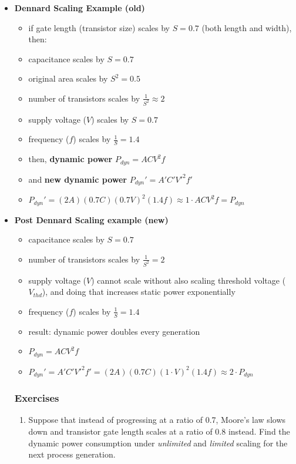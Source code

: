 \documentclass[12pt]{extarticle}
\begin{document}
\begin{itemize}
        \item \textbf{Dennard Scaling Example (old)}
        \begin{itemize}
            \item if gate length (transistor size) scales by $S = 0.7$ (both length and width), then:
            \item capacitance scales by $S = 0.7$
            \item original area scales by $S^2 = 0.5$
            \item number of transistors scales by $\frac{1}{S^2} \approx 2$
            \item supply voltage ($V$) scales by $S = 0.7$
            \item frequency ($f$) scales by $\frac{1}{S} = 1.4$
            \item then, \textbf{dynamic power} $P_{dyn} = ACV^2f$
            \item and \textbf{new dynamic power} $P_{dyn}' = A'C'V'^2f'$
            \item $P_{dyn}' = (2A)(0.7C)(0.7V)^2(1.4f) \approx 1 \cdot ACV^2f = P_{dyn}$
        \end{itemize}

        \item \textbf{Post Dennard Scaling example (new)}
        \begin{itemize}
            \item capacitance scales by $S = 0.7$
            \item number of transistors scales by $\frac{1}{S^2} = 2$
            \item supply voltage ($V$) cannot scale without also scaling threshold voltage ($V_{thd}$), and doing that 
            increases static power exponentially
            \item frequency ($f$) scales by $\frac{1}{S} = 1.4$
            \item result: dynamic power doubles every generation
            \item $P_{dyn} = ACV^2f$
            \item $P_{dyn}' = A'C'V'^2f' = (2A)(0.7C)(1 \cdot V)^2(1.4f) \approx 2 \cdot P_{dyn}$
        \end{itemize}

        \subsubsection{Exercises}

			\begin{enumerate}
				\item Suppose that instead of progressing at a ratio of 0.7, Moore’s law slows down and transistor gate length scales at a ratio of 0.8 instead. Find the dynamic power consumption under \textit{unlimited} and \textit{limited} scaling for the next process generation.


\end{enumerate}
\end{itemize}
\end{document}
